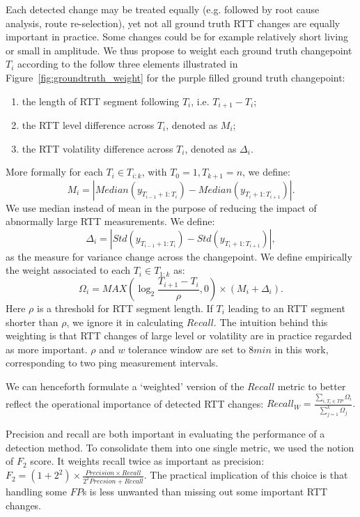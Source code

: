 Each detected change may be treated equally (e.g. followed by root cause analysis, route re-selection), yet not all ground truth RTT changes are equally important in practice.
Some changes could be for example relatively short living or small in amplitude.
We thus propose to weight each ground truth changepoint $T_i$ according to the follow three elements illustrated in Figure~\ref{fig:groundtruth_weight} for the purple filled ground truth changepoint:
\begin{enumerate}
\item the length of RTT segment following $T_i$, i.e. $T_{i+1} - T_i$;
\item the RTT level difference across $T_i$, denoted as $M_i$; 
\item the RTT volatility difference across $T_i$, denoted as $\Delta_i$.
\end{enumerate}
More formally for each $T_i \in T_{i:k}$, with $T_0=1, T_{k+1} = n$, we define:
\begin{equation*}
M_i = |Median(y_{T_{i-1}+1:T_i}) - Median(y_{T_i+1:T_{i+1}})|.
\end{equation*}
We use median instead of mean in the purpose of reducing the impact of abnormally large RTT measurements.
We define:
\begin{equation*}
\Delta_i = |Std(y_{T_{i-1}+1:T_i}) - Std(y_{T_i+1:T_{i+1}})|,
\end{equation*}
as the measure for variance change across the changepoint.
We define empirically the weight associated to each $T_i \in T_{1:k}$ as:
\begin{equation*}
\Omega_i = MAX(\log_2\frac{T_{i+1} - T_i}{\rho}, 0) \times (M_i + \Delta_i).
\end{equation*}
Here $\rho$ is a threshold for RTT segment length. 
If $T_i$ leading to an RTT segment shorter than $\rho$, we ignore it in calculating $Recall$.
The intuition behind this weighting is that RTT changes of large level or volatility are in practice regarded as more important. 
$\rho$ and $w$ tolerance window are set to $8min$ in this work, corresponding to two ping measurement intervals. 

We can henceforth formulate a `weighted' version of the $Recall$ metric to better reflect the operational importance of detected RTT changes: $Recall_W = \frac{\sum_{i, T_i \in TP} \Omega_i}{\sum_{j=1}^k \Omega_j}.$

Precision and recall are both important in evaluating the performance of a detection method.
To consolidate them into one single metric, we used the notion of $F_2$ score.
It weights recall twice as important as precision: $F_2 = (1+2^2) \times \frac{Precision \times Recall}{2^2Precsion + Recall}.$
The practical implication of this choice is that handling some $FP$s is less unwanted than missing out some important RTT changes.

